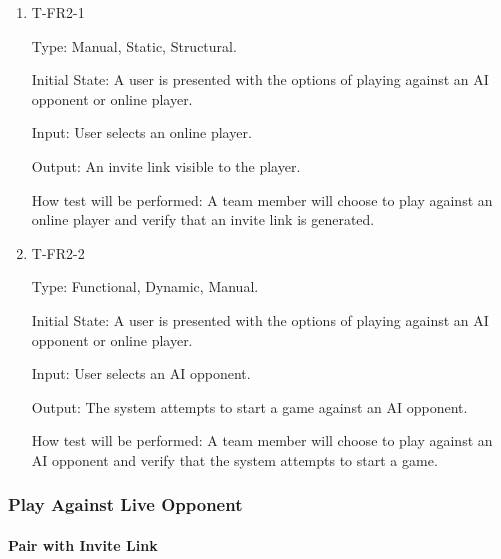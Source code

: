 \documentclass[12pt, titlepage]{article}
\begin{document}
        \begin{enumerate}
        
        \item{T-FR2-1\\}
        
            Type: Manual, Static, Structural.
            					
            Initial State: A user is presented with the options of playing against an AI opponent or online player.
            					
            Input: User selects an online player.
            					
            Output: An invite link visible to the player.
            					
            How test will be performed: A team member will choose to play against an online player and verify that an invite link is generated.
        
        \item{T-FR2-2\\}
        
            Type: Functional, Dynamic, Manual.
            					
            Initial State: A user is presented with the options of playing against an AI opponent or online player.
            					
            Input: User selects an AI opponent.
            					
            Output: The system attempts to start a game against an AI opponent.
            					
            How test will be performed: A team member will choose to play against an AI opponent and verify that the system attempts to start a game.
                
        \end{enumerate}

\subsubsection{Play Against Live Opponent}

    \paragraph{Pair with Invite Link}
\end{document}
